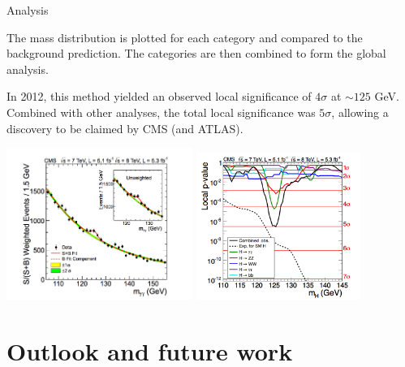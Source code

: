 \documentclass{beamer}
\begin{document}
\begin{frame}{Analysis}
\begin{itemize}{ \footnotesize
\vfill \item The mass distribution is plotted for each category and compared to the background prediction. The categories are then combined to form the global analysis.

\vfill \item In 2012, this method yielded an observed local significance of $4\sigma$ at $\sim 125$ GeV. Combined with other analyses, the total local significance was $5\sigma$, allowing a discovery to be claimed by CMS (and ATLAS).}
 \includegraphics[width=0.455\textwidth]{"Plot"}
\includegraphics[width=0.4\textwidth]{"PValue"}
\end{itemize}
\end{frame}
\section{Outlook and future work}
\end{document}

